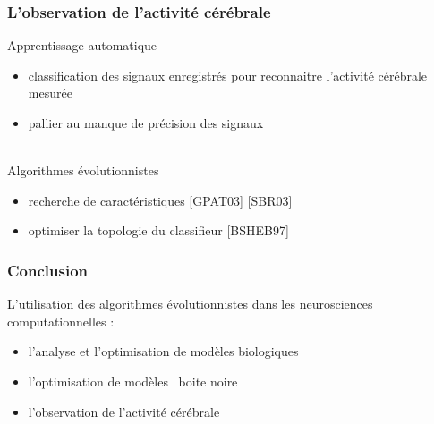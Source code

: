 \documentclass{beamer}
\begin{document}
\begin{frame}
\frametitle{L'observation de l'activité cérébrale}
Apprentissage automatique
\begin{itemize}
	\item classification des signaux enregistrés pour reconnaitre l'activité cérébrale mesurée
	\item pallier au manque de précision des signaux
\end{itemize}
~\\
Algorithmes évolutionnistes
\begin{itemize}
	\item recherche de caractéristiques [GPAT03] [SBR03]
	\item optimiser la topologie du classifieur [BSHEB97]
\end{itemize}
\end{frame}

\begin{frame}
\frametitle{Conclusion}
L'utilisation des algorithmes évolutionnistes dans les neurosciences computationnelles :
\begin{itemize}
	\item l'analyse et l'optimisation de modèles biologiques
    \item l'optimisation de modèles \og~boite noire~\fg
    \item l'observation de l'activité cérébrale
\end{itemize}
\end{frame}
\end{document}
